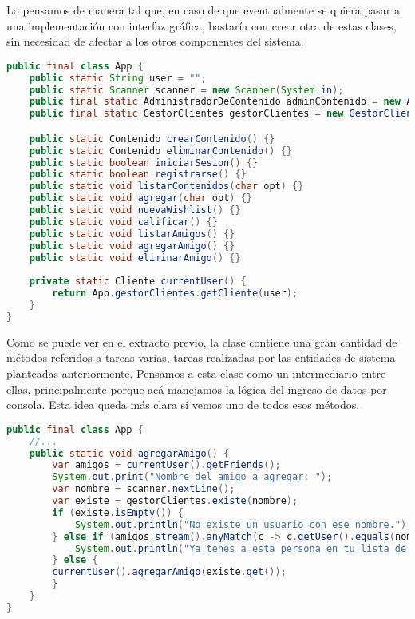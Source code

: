 Lo pensamos de manera tal que, en caso de que eventualmente se quiera pasar a una implementación con interfaz gráfica, 
bastaría con crear otra de estas clases, sin necesidad de afectar a los otros componentes del sistema.
\begin{lstlisting}[language=Java, caption={Vistazo de la clase principal del sistema.}]
public final class App {
    public static String user = "";
    public static Scanner scanner = new Scanner(System.in);
    public final static AdministradorDeContenido adminContenido = new AdministradorDeContenido(new PlataformaCentral());
    public final static GestorClientes gestorClientes = new GestorClientes();

    public static Contenido crearContenido() {}
    public static Contenido eliminarContenido() {}
    public static boolean iniciarSesion() {}
    public static boolean registrarse() {}
    public static void listarContenidos(char opt) {}
    public static void agregar(char opt) {}
    public static void nuevaWishlist() {}
    public static void calificar() {}
    public static void listarAmigos() {}
    public static void agregarAmigo() {}
    public static void eliminarAmigo() {}
    
    private static Cliente currentUser() {
        return App.gestorClientes.getCliente(user);
    }
}
\end{lstlisting}
Como se puede ver en el extracto previo, la clase contiene una gran cantidad de métodos referidos a tareas varias, tareas
realizadas por las \hyperlink{entidades-sistema}{entidades de sistema} planteadas anteriormente.
Pensamos a esta clase como un intermediario entre ellas, principalmente porque acá manejamos la lógica del ingreso de
datos por consola.
Esta idea queda más clara si vemos uno de todos esos métodos.
\begin{lstlisting}[language=Java, caption={Vistazo de uno de los métodos referidos al ingreso de datos.}]
public final class App {
    //...
    public static void agregarAmigo() {
        var amigos = currentUser().getFriends();
        System.out.print("Nombre del amigo a agregar: ");
        var nombre = scanner.nextLine();
        var existe = gestorClientes.existe(nombre);
        if (existe.isEmpty()) {
            System.out.println("No existe un usuario con ese nombre.");
        } else if (amigos.stream().anyMatch(c -> c.getUser().equals(nombre))) {
            System.out.println("Ya tenes a esta persona en tu lista de amigos.");
        } else {
        currentUser().agregarAmigo(existe.get());
        }
    }
}
\end{lstlisting}


